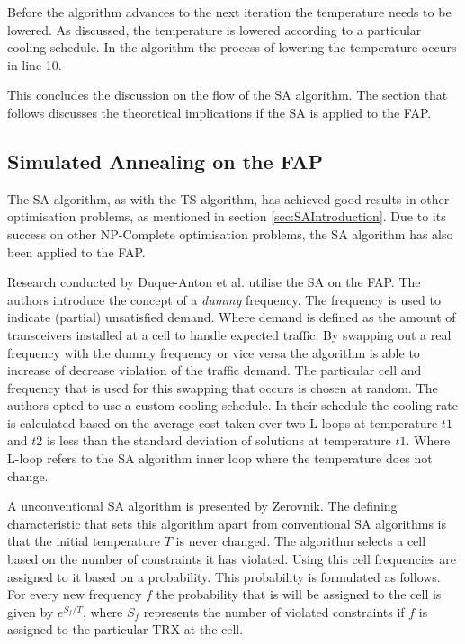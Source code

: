 Before the algorithm advances to the next iteration the temperature needs to be lowered. As discussed, the temperature is lowered according to a particular cooling schedule. In the algorithm the process of lowering the temperature occurs in line 10. 

This concludes the discussion on the flow of the SA algorithm. The section that follows discusses the theoretical implications if the \gls{SA} is applied to the \gls{FAP}.
\subsection{Simulated Annealing on the \gls{FAP}}
\label{sec:saonfap}
The \gls{SA} algorithm, as with the \gls{TS} algorithm, has achieved good results in other optimisation problems, as mentioned in section \ref{sec:SAIntroduction}. Due to its success on other NP-Complete optimisation problems, the \gls{SA} algorithm has also been applied to the \gls{FAP}.

Research conducted by Duque-Anton et al.\cite{SAChanAss} utilise the \gls{SA} on the FAP. The authors introduce the concept of a \emph{dummy} frequency. The frequency is used to indicate (partial) unsatisfied demand. Where demand is defined as the amount of transceivers installed at a cell to handle expected traffic. By swapping out a real frequency with the dummy frequency or vice versa the algorithm is able to increase of decrease violation of the traffic demand. The particular cell and frequency that is used for this swapping that occurs is chosen at random. The authors opted to use a custom cooling schedule. In their schedule the cooling rate is calculated based on the average cost taken over two L-loops at temperature $t1$ and $t2$ is less than the standard deviation of solutions at temperature $t1$. Where L-loop refers to the \gls{SA} algorithm inner loop where the temperature does not change.

A unconventional \gls{SA} algorithm  is presented by Zerovnik\cite{Zerovnik97}. The defining characteristic that sets this algorithm apart from conventional \gls{SA} algorithms is that the initial temperature $T$ is never changed. The algorithm selects a cell based on the number of constraints it has violated. Using this cell frequencies are assigned to it based on a probability. This probability is formulated as follows. For every new frequency $f$ the probability that is will be assigned to the cell is given by $e^{S_f/T}$, where $S_f$ represents the number of violated constraints if $f$ is assigned to the particular TRX at the cell.

